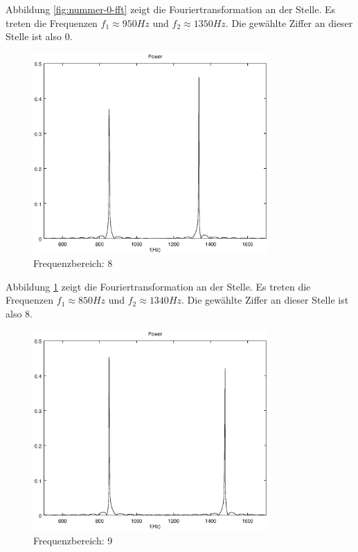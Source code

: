 \documentclass[a4paper]{article}
\begin{document}
Abbildung \ref{fig:nummer-0-fft} zeigt die Fouriertransformation an der Stelle. Es treten die Frequenzen $f_1\approx950\si{Hz}$ und $f_2\approx1350\si{Hz}$. Die gewählte Ziffer an dieser Stelle ist also 0.

\begin{figure}[H]
    \centering
    \includegraphics[width=0.8\textwidth, keepaspectratio]{nummer_8_fft.eps}
    \caption{Frequenzbereich: 8}
    \label{fig:nummer-8-fft}
\end{figure}

Abbildung \ref{fig:nummer-8-fft} zeigt die Fouriertransformation an der Stelle. Es treten die Frequenzen $f_1\approx850\si{Hz}$ und $f_2\approx1340\si{Hz}$. Die gewählte Ziffer an dieser Stelle ist also 8.

\begin{figure}[H]
    \centering
    \includegraphics[width=0.8\textwidth, keepaspectratio]{nummer_9_fft.eps}
    \caption{Frequenzbereich: 9}
    \label{fig:nummer-9-fft}
\end{figure}
\end{document}
